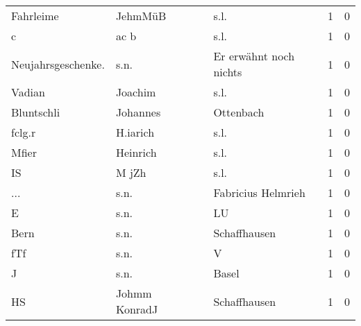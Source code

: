 \begin{center}
\begin{tiny}
\begin{longtabu}{llllrr}
                Fahrleime &                            JehmMüB &             &                                        s.l. &          1 &         0 \\
                        c &                               ac b &             &                                        s.l. &          1 &         0 \\
       Neujahrsgeschenke. &                               s.n. &             &                      Er erwähnt noch nichts &          1 &         0 \\
                   Vadian &                            Joachim &             &                                        s.l. &          1 &         0 \\
               Bluntschli &                           Johannes &             &                                   Ottenbach &          1 &         0 \\
                   fclg.r &                           H.iarich &             &                                        s.l. &          1 &         0 \\
                    Mfier &                           Heinrich &             &                                        s.l. &          1 &         0 \\
                       IS &                              M jZh &             &                                        s.l. &          1 &         0 \\
                      ... &                               s.n. &             &                          Fabricius Helmrieh &          1 &         0 \\
                        E &                               s.n. &             &                                          LU &          1 &         0 \\
                     Bern &                               s.n. &             &                                Schaffhausen &          1 &         0 \\
                      fTf &                               s.n. &             &                                           V &          1 &         0 \\
                        J &                               s.n. &             &                                       Basel &          1 &         0 \\
                       HS &                      Johmm KonradJ &             &                                Schaffhausen &          1 &         0 \\

\end{longtabu}
\end{tiny}
\end{center}
